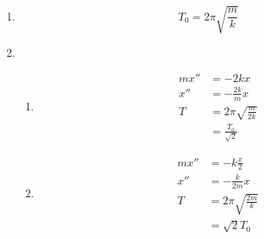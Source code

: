 \documentclass{article}
\begin{document}
\begin{enumerate}
  \item \[T_0 = 2 \pi \sqrt{\frac{m}{k}}\]

  \item

        \begin{enumerate}
          \item

                \begin{align*}
                  m x'' & = -2 k x                     \\
                  x''   & = -\frac{2 k}{m} x           \\
                  T     & = 2 \pi \sqrt{\frac{m}{2 k}} \\
                        & = \frac{T_0}{\sqrt{2}}
                \end{align*}

          \item

                \begin{align*}
                  m x'' & = -k \frac{x}{2}             \\
                  x''   & = -\frac{k}{2 m} x           \\
                  T     & = 2 \pi \sqrt{\frac{2 m}{k}} \\
                        & = \sqrt{2} T_0
                \end{align*}
        \end{enumerate}
\end{enumerate}

\subsection{}
\end{document}
